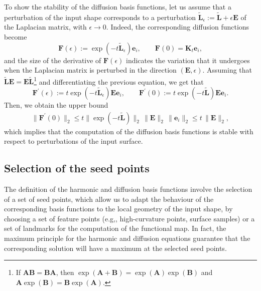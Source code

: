 \documentclass[acmtog,authorversion]{acmart}
\begin{document}
To show the stability of the diffusion basis functions, let us assume that a perturbation of the input shape corresponds to a perturbation \mbox{$\tilde{\mathbf{L}}_{\epsilon}:=\tilde{\mathbf{L}}+\epsilon\mathbf{E}$} of the Laplacian matrix, with \mbox{$\epsilon\rightarrow 0$}. Indeed, the corresponding diffusion functions become
%
\begin{equation*}
\mathbf{F}(\epsilon)
:=\exp(-t\tilde{\mathbf{L}}_\epsilon)\mathbf{e}_{i},\qquad
\mathbf{F}(0)=\mathbf{K}_{t}\mathbf{e}_{i},
\end{equation*}
%
and the size of the derivative of \mbox{$\mathbf{F}(\epsilon)$} indicates the variation that it undergoes when the Laplacian matrix is perturbed in the direction \mbox{$(\mathbf{E},\epsilon)$}. Assuming that \mbox{$\tilde{\mathbf{L}}\mathbf{E}=\mathbf{E}\tilde{\mathbf{L}}$}\footnote{If \mbox{$\mathbf{A}\mathbf{B}=\mathbf{B}\mathbf{A}$}, then \mbox{$\exp(\mathbf{A}+\mathbf{B})=\exp(\mathbf{A})\exp(\mathbf{B})$} and \mbox{$\mathbf{A}\exp(\mathbf{B})=\mathbf{B}\exp(\mathbf{A})$}.} and differentiating the previous equation, we get that
%
\begin{equation*}
\mathbf{F}^{\prime}(\epsilon)
:=t\exp(-t\tilde{\mathbf{L}}_\epsilon)\mathbf{E}\mathbf{e}_{i},\qquad
\mathbf{F}^{\prime}(0)
:=t\exp(-t\tilde{\mathbf{L}})\mathbf{E}\mathbf{e}_{i}.
\end{equation*}
%
Then, we obtain the upper bound
%
\begin{equation*}
\begin{split}
\|\mathbf{F}^{\prime}(0)\|_{2}
\leq t\|\exp(-t\tilde{\mathbf{L}})\|_{2}\,\|\mathbf{E}\|_{2}\,\|\mathbf{e}_{i}\|_{2}
\leq t\,\|\mathbf{E}\|_{2},
\end{split}
\end{equation*}
%
which implies that the computation of the diffusion basis functions is stable with respect to perturbations of the input surface.

\subsection{Selection of the seed points\label{sec:SEED-SELECTION}}
The definition of the harmonic and diffusion basis functions involve the selection of a set of seed points, which allow us to adapt the behaviour of the corresponding basis functions to the local geometry of the input shape, by choosing a set of feature points (e.g,, high-curvature points, surface samples) or a set of landmarks for the computation of the functional map. In fact, the maximum principle for the harmonic and diffusion equations guarantee that the corresponding solution will have a maximum at the selected seed points.
\end{document}
